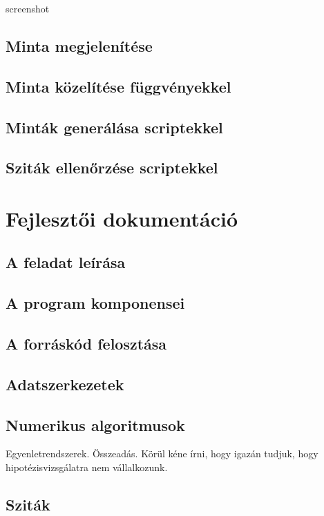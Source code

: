 \documentclass[12pt]{report}
\begin{document}
{\color{red}screenshot}

\section{Minta megjelenítése}

\section{Minta közelítése függvényekkel}

\section{Minták generálása scriptekkel}

\section{Sziták ellenőrzése scriptekkel}


\chapter{Fejlesztői dokumentáció}

\section{A feladat leírása}

\section{A program komponensei}

\section{A forráskód felosztása}

\section{Adatszerkezetek}

\section{Numerikus algoritmusok}

Egyenletrendszerek. Összeadás.
Körül kéne írni, hogy igazán tudjuk, hogy hipotézisvizsgálatra nem vállalkozunk.

\section{Sziták}
\end{document}
